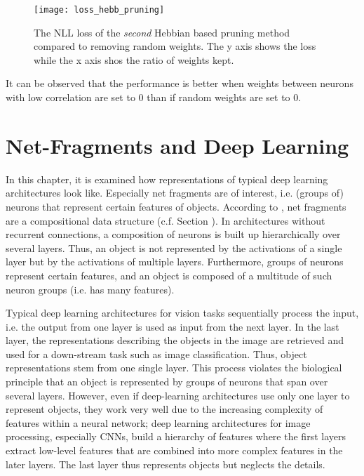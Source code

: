\begin{figure}[h]
    \centering
    \texttt{[image: loss\_hebb\_pruning]}
    \caption[NLL Loss of Hebbian Pruning]{The NLL loss of the \emph{second} Hebbian based pruning method compared to removing random weights. The y axis shows the loss while the x axis shos the ratio of weights kept. }
\end{figure}

It can be observed that the performance is better when weights between neurons with low correlation are set to \(0\) than if random weights are set to \(0\).


\pagebreak
\chapter{Net-Fragments and Deep Learning}
In this chapter, it is examined how representations of typical deep learning architectures look like.
Especially net fragments are of interest, i.e. (groups of) neurons that represent certain features of objects.
According to , net fragments are a compositional data structure (c.f. Section ).
In architectures without recurrent connections, a composition of neurons is built up hierarchically over several layers.
Thus, an object is not represented by the activations of a single layer but by the activations of multiple layers.
Furthermore, groups of neurons represent certain features, and an object is composed of a multitude of such neuron groups (i.e. has many features).

Typical deep learning architectures for vision tasks sequentially process the input, i.e. the output from one layer is used as input from the next layer.
In the last layer, the representations describing the objects in the image are retrieved and used for a down-stream task such as image classification.
Thus, object representations stem from one single layer.
This process violates the biological principle that an object is represented by groups of neurons that span over several layers.
However, even if deep-learning architectures use only one layer to represent objects, they work very well due to the increasing complexity of features within a neural network; deep learning architectures for image processing, especially CNNs, build a hierarchy of features where the first layers extract low-level features that are combined into more complex features in the later layers. The last layer thus represents objects but neglects the details.

